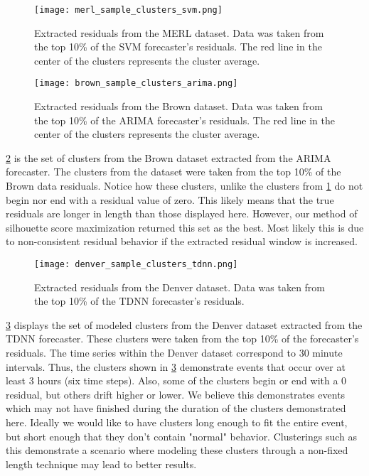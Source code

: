 \begin{figure}
	\begin{center}
		\texttt{[image: merl\_sample\_clusters\_svm.png]}
	\end{center}
	\caption{Extracted residuals from the MERL dataset.  Data was taken from the top 10\% of the SVM forecaster's residuals.  The red line in the center of the clusters represents the cluster average.}
	\label{fig:merl_clusters}
\end{figure}

\begin{figure}
	\begin{center}
		\texttt{[image: brown\_sample\_clusters\_arima.png]}
	\end{center}
	\caption{Extracted residuals from the Brown dataset.  Data was taken from the top 10\% of the ARIMA forecaster's residuals.  The red line in the center of the clusters represents the cluster average.}
	\label{fig:brown_clusters}
\end{figure}

\ref{fig:brown_clusters} is the set of clusters from the Brown dataset extracted from the ARIMA forecaster.  The clusters from the dataset were taken from the top 10\% of the Brown data residuals.  Notice how these clusters, unlike the clusters from \ref{fig:merl_clusters} do not begin nor end with a residual value of zero.  This likely means that the true residuals are longer in length than those displayed here.  However, our method of silhouette score maximization returned this set as the best.  Most likely this is due to non-consistent residual behavior if the extracted residual window is increased.
  
\begin{figure}
	\begin{center}
		\texttt{[image: denver\_sample\_clusters\_tdnn.png]}
	\end{center}
	\caption{Extracted residuals from the Denver dataset.  Data was taken from the top 10\% of the TDNN forecaster's residuals.}
	\label{fig:denver_clusters}
\end{figure}

\ref{fig:denver_clusters} displays the set of modeled clusters from the Denver dataset extracted from the TDNN forecaster.  These clusters were taken from the top 10\% of the forecaster's residuals.  The time series within the Denver dataset correspond to 30 minute intervals.  Thus, the clusters shown in \ref{fig:denver_clusters} demonstrate events that occur over at least 3 hours (six time steps).  Also, some of the clusters begin or end with a 0 residual, but others drift higher or lower.  We believe this demonstrates events which may not have finished during the duration of the clusters demonstrated here.  Ideally we would like to have clusters long enough to fit the entire event, but short enough that they don't contain "normal" behavior.  Clusterings such as this demonstrate a scenario where modeling these clusters through a non-fixed length technique may lead to better results.

